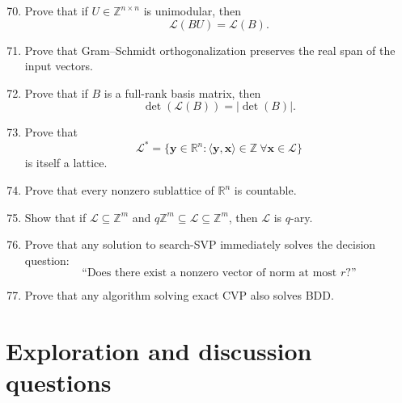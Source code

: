 \documentclass[11pt]{article}
\begin{document}
\begin{enumerate}
	\setcounter{enumi}{69}
	\item Prove that if \(U\in\mathbb{Z}^{n\times n}\) is unimodular, then
	\[
	\mathcal{L}(BU)=\mathcal{L}(B).
	\]
	
	\item Prove that Gram--Schmidt orthogonalization preserves the real span of the input vectors.
	
	\item Prove that if \(B\) is a full-rank basis matrix, then
	\[
	\det(\mathcal{L}(B))=|\det(B)|.
	\]
	
	\item Prove that
	\[
	\mathcal{L}^*=
	\{\mathbf{y}\in\mathbb{R}^n : \langle \mathbf{y},\mathbf{x}\rangle\in\mathbb{Z}\ \forall \mathbf{x}\in\mathcal{L}\}
	\]
	is itself a lattice.
	
	\item Prove that every nonzero sublattice of \(\mathbb{R}^n\) is countable.
	
	\item Show that if \(\mathcal{L}\subseteq\mathbb{Z}^m\) and \(q\mathbb{Z}^m\subseteq \mathcal{L}\subseteq \mathbb{Z}^m\), then \(\mathcal{L}\) is \(q\)-ary.
	
	\item Prove that any solution to search-SVP immediately solves the decision question:
	\[
	\text{``Does there exist a nonzero vector of norm at most } r\text{?''}
	\]
	
	\item Prove that any algorithm solving exact CVP also solves BDD.
\end{enumerate}

\section{Exploration and discussion questions}
\end{document}
